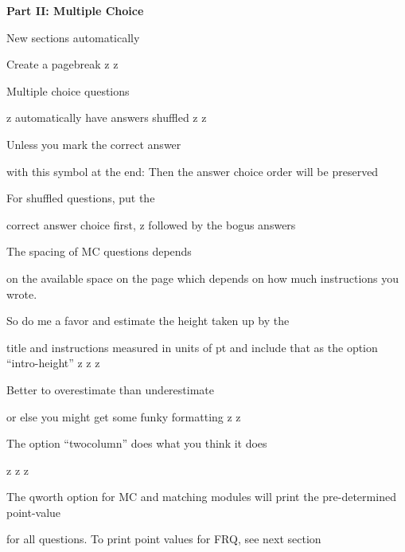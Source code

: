 \documentclass{exam}
\begin{document}
\newpage
\par\noindent \textbf{\large  Part II: Multiple Choice}
\setlength{\columnsep}{0.40 in}
\begin{multicols*}{2}
\renewcommand{\choiceshook}{\setlength{\leftmargin}{0.40 in}}
\renewcommand{\questionshook}{\setlength{\leftmargin}{0.0 in}}
\begin{questions}
\setcounter{question}{12}
	\question[2] New sections automatically
	\begin{choices}
		\CorrectChoice Create a pagebreak
		\choice z
		\choice z
	\end{choices}
	\question[2] Multiple choice questions
	\begin{choices}
		\choice z
		\CorrectChoice automatically have answers shuffled
		\choice z
		\choice z
	\end{choices}
	\question[2] Unless you mark the correct answer
	\begin{choices}
		\CorrectChoice with this symbol at the end:
		\choice Then the answer choice order
		\choice will be
		\choice preserved
	\end{choices}
	\question[2] For shuffled questions, put the
	\begin{choices}
		\CorrectChoice correct answer choice first,
		\choice z
		\choice followed by the bogus answers
	\end{choices}
	\question[2] The spacing of MC questions depends
	\begin{choices}
		\choice on the available space on the page
		\CorrectChoice which depends on how much instructions you wrote.
	\end{choices}
	\question[2] So do me a favor and estimate the height taken up by the
	\begin{choices}
		\choice title and instructions
		\CorrectChoice measured in units of pt
		\choice and include that as the option ``intro-height''
		\choice z
		\choice z
		\choice z
	\end{choices}
	\question[2] Better to overestimate than underestimate
	\begin{choices}
		\CorrectChoice or else you might get some funky formatting
		\choice z
		\choice z
	\end{choices}
	\vfill\null\columnbreak
	\question[2] The option ``twocolumn'' does what you think it does
	\begin{choices}
		\CorrectChoice z
		\CorrectChoice z
		\CorrectChoice z
	\end{choices}
	\question[2] The qworth option for MC and matching modules will print the pre-determined point-value
	\begin{choices}
		\CorrectChoice for all questions.
		\choice To print point values for FRQ, see next section
	\end{choices}
\end{questions}
\end{multicols*}
\renewcommand{\choiceshook}{}
\renewcommand{\questionshook}{}
\end{document}
